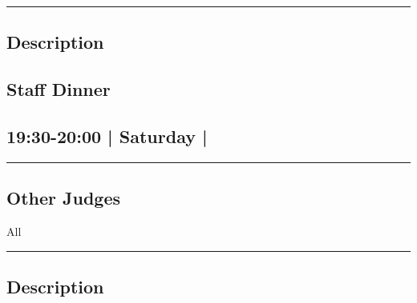 \documentclass[10pt, A5]{article}
\begin{document}
\begin{framed}
\begin{minipage}{\textwidth}
			\vspace{0.25cm}
			\hrule
			\vspace{0.25cm}

			\begin{minipage}{\textwidth}
			\subsection*{\faListAlt \: Description}
			
			\end{minipage}


	\end{minipage}
	\end{framed}

	

		\begin{framed}
			\begin{minipage}{\textwidth}

			\setcounter{section}{71}
							\section{Staff Dinner}
						
			\subsection*{19:30-20:00 | Saturday | }

			\vspace{0.25cm}
			\hrule
			\vspace{0.25cm}


			\subsection*{Other Judges}
							All

					\vspace{0.25cm}
			\hrule
			\vspace{0.25cm}

			\begin{minipage}{\textwidth}
			\subsection*{\faListAlt \: Description}
			
			\end{minipage}


	\end{minipage}
	\end{framed}
\end{document}
